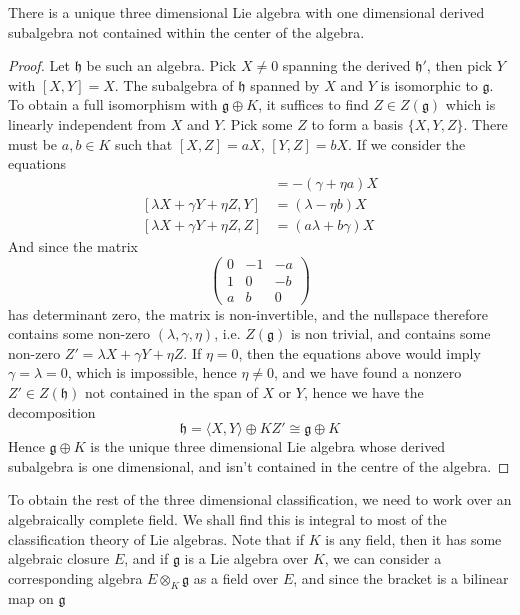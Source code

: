\begin{theorem}
    There is a unique three dimensional Lie algebra with one dimensional derived subalgebra not contained within the center of the algebra.
\end{theorem}
\begin{proof}
    Let $\mathfrak{h}$ be such an algebra. Pick $X \neq 0$ spanning the derived $\mathfrak{h}'$, then pick $Y$ with $[X,Y] = X$. The subalgebra of $\mathfrak{h}$ spanned by $X$ and $Y$ is isomorphic to $\mathfrak{g}$. To obtain a full isomorphism with $\mathfrak{g} \oplus K$, it suffices to find $Z \in Z(\mathfrak{g})$ which is linearly independent from $X$ and $Y$. Pick some $Z$ to form a basis $\{ X, Y, Z \}$. There must be $a, b \in K$ such that $[X,Z] = aX$, $[Y,Z] = bX$. If we consider the equations
    \begin{align*}
        [\lambda X + \gamma Y + \eta Z, X] &= -(\gamma + \eta a) X\\
        [\lambda X + \gamma Y + \eta Z, Y] &= (\lambda - \eta b) X\\
        [\lambda X + \gamma Y + \eta Z, Z] &= (a \lambda + b \gamma) X
    \end{align*}
    And since the matrix 
    \[ \begin{pmatrix} 0 & -1 & -a \\ 1 & 0 & -b \\ a & b & 0 \end{pmatrix} \]
    has determinant zero, the matrix is non-invertible, and the nullspace therefore contains some non-zero $(\lambda, \gamma, \eta)$, i.e. $Z(\mathfrak{g})$ is non trivial, and contains some non-zero $Z' = \lambda X + \gamma Y + \eta Z$. If $\eta = 0$, then the equations above would imply $\gamma = \lambda = 0$, which is impossible, hence $\eta \neq 0$, and we have found a nonzero $Z' \in Z(\mathfrak{h})$ not contained in the span of $X$ or $Y$, hence we have the decomposition
    \[ \mathfrak{h} = \langle X, Y \rangle \oplus KZ' \cong \mathfrak{g} \oplus K \]
    Hence $\mathfrak{g} \oplus K$ is the unique three dimensional Lie algebra whose derived subalgebra is one dimensional, and isn't contained in the centre of the algebra.
\end{proof}

To obtain the rest of the three dimensional classification, we need to work over an algebraically complete field. We shall find this is integral to most of the classification theory of Lie algebras. Note that if $K$ is any field, then it has some algebraic closure $E$, and if $\mathfrak{g}$ is a Lie algebra over $K$, we can consider a corresponding algebra $E \otimes_K \mathfrak{g}$ as a field over $E$, and since the bracket is a bilinear map on $\mathfrak{g}$ 

